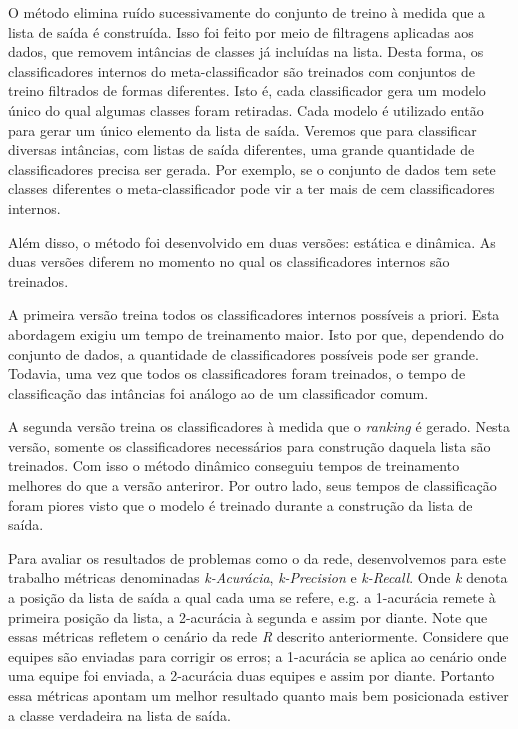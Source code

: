 O método elimina ruído sucessivamente do conjunto de treino à medida que a lista de saída é construída.
Isso foi feito por meio de filtragens aplicadas aos dados, que removem intâncias de classes já incluídas na lista.
Desta forma, os classificadores internos do meta-classificador são treinados com conjuntos de treino filtrados de formas diferentes.
Isto é, cada classificador gera um modelo único do qual algumas classes foram retiradas.
Cada modelo é utilizado então para gerar um único elemento da lista de saída.
Veremos que para classificar diversas intâncias, com listas de saída diferentes, uma grande quantidade de classificadores precisa ser gerada.
Por exemplo, se o conjunto de dados tem sete classes diferentes o meta-classificador pode vir a ter mais de cem classificadores internos.

Além disso, o método foi desenvolvido em duas versões: estática e dinâmica.
As duas versões diferem no momento no qual os classificadores internos são treinados.

A primeira versão treina todos os classificadores internos possíveis a priori.
Esta abordagem exigiu um tempo de treinamento maior.
Isto por que, dependendo do conjunto de dados, a quantidade de classificadores possíveis pode ser grande.
Todavia, uma vez que todos os classificadores foram treinados, o tempo de classificação das intâncias foi análogo ao de um classificador comum.

A segunda versão treina os classificadores à medida que o \textit{ranking} é gerado.
Nesta versão, somente os classificadores necessários para construção daquela lista são treinados.
Com isso o método dinâmico conseguiu tempos de treinamento melhores do que a versão anteriror.
Por outro lado, seus tempos de classificação foram piores visto que o modelo é treinado durante a construção da lista de saída.

Para avaliar os resultados de problemas como o da rede, desenvolvemos para este trabalho métricas denominadas \textit{k-Acurácia}, \textit{k-Precision} e \textit{k-Recall}.
Onde \textit{k} denota a posição da lista de saída a qual cada uma se refere, e.g. a 1-acurácia remete à primeira posição da lista, a 2-acurácia à segunda e assim por diante.
Note que essas métricas refletem o cenário da rede \textit{R} descrito anteriormente.
Considere que equipes são enviadas para corrigir os erros; a 1-acurácia se aplica ao cenário onde uma equipe foi enviada, a 2-acurácia duas equipes e assim por diante.
Portanto essa métricas apontam um melhor resultado quanto mais bem posicionada estiver a classe verdadeira na lista de saída.

